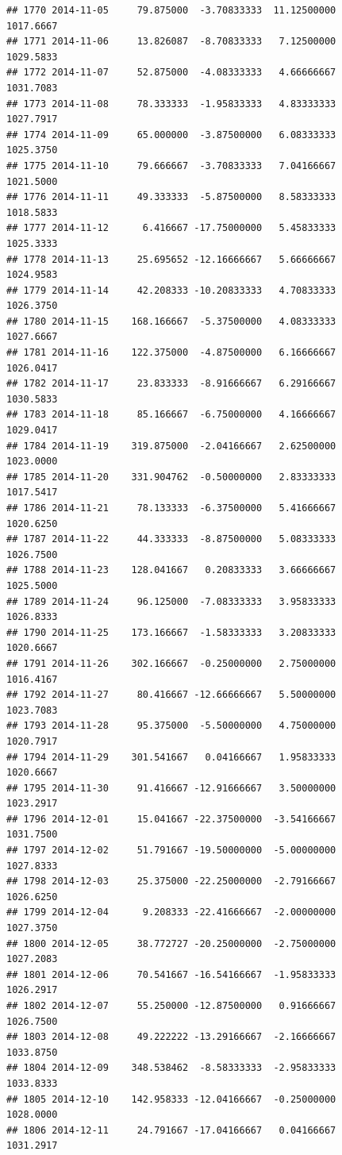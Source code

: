 \documentclass[
]{article}
\begin{document}
\begin{verbatim}
## 1770 2014-11-05     79.875000  -3.70833333  11.12500000    1017.6667
## 1771 2014-11-06     13.826087  -8.70833333   7.12500000    1029.5833
## 1772 2014-11-07     52.875000  -4.08333333   4.66666667    1031.7083
## 1773 2014-11-08     78.333333  -1.95833333   4.83333333    1027.7917
## 1774 2014-11-09     65.000000  -3.87500000   6.08333333    1025.3750
## 1775 2014-11-10     79.666667  -3.70833333   7.04166667    1021.5000
## 1776 2014-11-11     49.333333  -5.87500000   8.58333333    1018.5833
## 1777 2014-11-12      6.416667 -17.75000000   5.45833333    1025.3333
## 1778 2014-11-13     25.695652 -12.16666667   5.66666667    1024.9583
## 1779 2014-11-14     42.208333 -10.20833333   4.70833333    1026.3750
## 1780 2014-11-15    168.166667  -5.37500000   4.08333333    1027.6667
## 1781 2014-11-16    122.375000  -4.87500000   6.16666667    1026.0417
## 1782 2014-11-17     23.833333  -8.91666667   6.29166667    1030.5833
## 1783 2014-11-18     85.166667  -6.75000000   4.16666667    1029.0417
## 1784 2014-11-19    319.875000  -2.04166667   2.62500000    1023.0000
## 1785 2014-11-20    331.904762  -0.50000000   2.83333333    1017.5417
## 1786 2014-11-21     78.133333  -6.37500000   5.41666667    1020.6250
## 1787 2014-11-22     44.333333  -8.87500000   5.08333333    1026.7500
## 1788 2014-11-23    128.041667   0.20833333   3.66666667    1025.5000
## 1789 2014-11-24     96.125000  -7.08333333   3.95833333    1026.8333
## 1790 2014-11-25    173.166667  -1.58333333   3.20833333    1020.6667
## 1791 2014-11-26    302.166667  -0.25000000   2.75000000    1016.4167
## 1792 2014-11-27     80.416667 -12.66666667   5.50000000    1023.7083
## 1793 2014-11-28     95.375000  -5.50000000   4.75000000    1020.7917
## 1794 2014-11-29    301.541667   0.04166667   1.95833333    1020.6667
## 1795 2014-11-30     91.416667 -12.91666667   3.50000000    1023.2917
## 1796 2014-12-01     15.041667 -22.37500000  -3.54166667    1031.7500
## 1797 2014-12-02     51.791667 -19.50000000  -5.00000000    1027.8333
## 1798 2014-12-03     25.375000 -22.25000000  -2.79166667    1026.6250
## 1799 2014-12-04      9.208333 -22.41666667  -2.00000000    1027.3750
## 1800 2014-12-05     38.772727 -20.25000000  -2.75000000    1027.2083
## 1801 2014-12-06     70.541667 -16.54166667  -1.95833333    1026.2917
## 1802 2014-12-07     55.250000 -12.87500000   0.91666667    1026.7500
## 1803 2014-12-08     49.222222 -13.29166667  -2.16666667    1033.8750
## 1804 2014-12-09    348.538462  -8.58333333  -2.95833333    1033.8333
## 1805 2014-12-10    142.958333 -12.04166667  -0.25000000    1028.0000
## 1806 2014-12-11     24.791667 -17.04166667   0.04166667    1031.2917

\end{verbatim}
\end{document}
